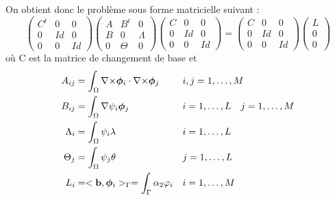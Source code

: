 \documentclass[a4paper,11pt]{article}
\begin{document}
On obtient donc le problème sous forme matricielle suivant :
\begin{equation*}
  \begin{pmatrix}
    C^t & 0 & 0\\
    0 & Id & 0\\
    0 & 0 & Id
  \end{pmatrix}
  \begin{pmatrix}
    A & B^t & 0\\
    B & 0 & \Lambda\\
    0 & \Theta & 0
  \end{pmatrix}
  \begin{pmatrix}
    C & 0 & 0\\
    0 & Id & 0\\
    0 & 0 & Id
  \end{pmatrix}
  =
  \begin{pmatrix}
    C & 0 & 0\\
    0 & Id & 0\\
    0 & 0 & Id
  \end{pmatrix}
    \begin{pmatrix}
    L\\
    0\\
    0
  \end{pmatrix}
\end{equation*}
où C est la matrice de changement de base et
\begin{align*}
  A_{ij} &= \int_\Omega {\nabla\times}\bm{\phi}_i\cdot{\nabla\times}\bm{\phi}_j && i,j=1,\dots,M\\
  B_{ij} &= \int_\Omega {\nabla}\psi_i\bm{\phi}_j && i=1,\dots,L\quad j=1,\dots,M\\
  \Lambda_i &= \int_\Omega \psi_i\lambda  && i=1,\dots,L\\
  \Theta_j &= \int_\Omega \psi_j\theta && j=1,\dots,L\\
  L_{i} &= <{\mathbf{b}},\bm{\phi}_i>_\Gamma = \int_\Gamma \alpha_2\varphi_i && i=1,\dots,M
\end{align*}
\end{document}
